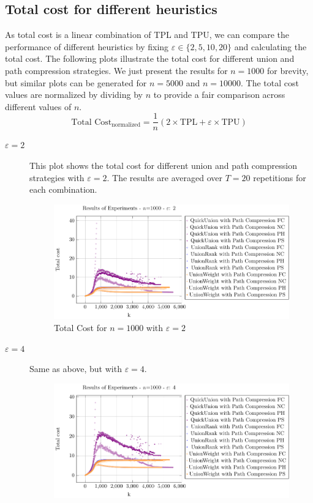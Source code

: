 \documentclass[10pt,a4paper,hidelinks]{article}
\begin{document}
\subsection{Total cost for different heuristics}
As total cost is a linear combination of TPL and TPU, we can compare the performance of different heuristics by fixing $\varepsilon \in \{2, 5, 10, 20\}$ and calculating the total cost. The following plots illustrate the total cost for different union and path compression strategies. We just present the results for $n = 1000$ for brevity, but similar plots can be generated for $n = 5000$ and $n = 10000$. The total cost values are normalized by dividing by $n$ to provide a fair comparison across different values of $n$.
$$\boxed{\text{Total Cost}_{\text{normalized}} = \dfrac{1}{n}\left(2\times\text{TPL} + \varepsilon \times \text{TPU}\right)}$$
\begin{description}
    \item[$\varepsilon = 2$] This plot shows the total cost for different union and path compression strategies with $\varepsilon = 2$. The results are averaged over $T=20$ repetitions for each combination.
        \begin{figure}[h!]
            \centering
            \includegraphics[width=\linewidth]{plots/plot_1000_Total_cost_epsilon_2.pdf}
            \caption{Total Cost for $n = 1000$ with $\varepsilon = 2$}
        \end{figure}
    \item[$\varepsilon = 4$] Same as above, but with $\varepsilon = 4$.
        \begin{figure}[h!]
            \centering
            \includegraphics[width=\linewidth]{plots/plot_1000_Total_cost_epsilon_4.pdf}

\end{figure}
\end{description}
\end{document}
